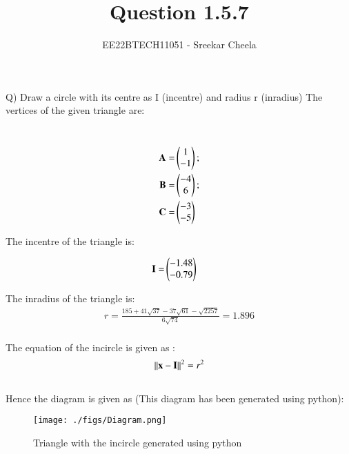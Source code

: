 \documentclass[journal,12pt,twocolumn]{IEEEtran}
\theoremstyle{remark}
\begin{document}
%




\vspace{3cm}

\title{
Question 1.5.7
}
\author{ EE22BTECH11051 - Sreekar Cheela 
}	

\maketitle

\newpage


\begin{flushleft}
	\large Q) Draw a circle with its centre as I (incentre) and radius r (inradius)
	\bigskip
	\large The vertices of the given triangle are:
\end{flushleft}
\\
\begin{align}
	\mathbf {A}= &\begin{pmatrix}1\\-1\end{pmatrix};\\ \mathbf {B}= &\begin{pmatrix}-4\\6\end{pmatrix};\\ \mathbf {C}= &\begin{pmatrix}-3\\-5\end{pmatrix}
\end{align}

\begin{flushleft}
	\large The incentre of the triangle is:
\end{flushleft}

\begin{align}
	\mathbf{I}=&\begin{pmatrix}
		-1.48 \\
		-0.79\end{pmatrix}
\end{align}

\begin{flushleft}
    \large The inradius of the triangle is:
    \\
    \begin{align}
    r = \frac{185+41\sqrt{37}-37\sqrt{61}-\sqrt{2257}}{6\sqrt{74}} = 1.896\\
    \end{align}

	\large The equation of the incircle is given as :\\

	\begin{align}
		{
			\left\lVert\mathbf{x}-\mathbf{I}\right\rVert^2 = r^2
		}
	\end{align}
    \\Hence the diagram is given as (This diagram has been generated using python):
    \\
\end{flushleft}

\begin{figure}[h]
	\centering
	\texttt{[image: ./figs/Diagram.png]}
	\caption{Triangle with the incircle generated using python}
	\label{Incircle}
\end{figure}

\renewcommand{\thefigure}{\theenumi}
\renewcommand{\thetable}{\theenumi}
\end{document}
